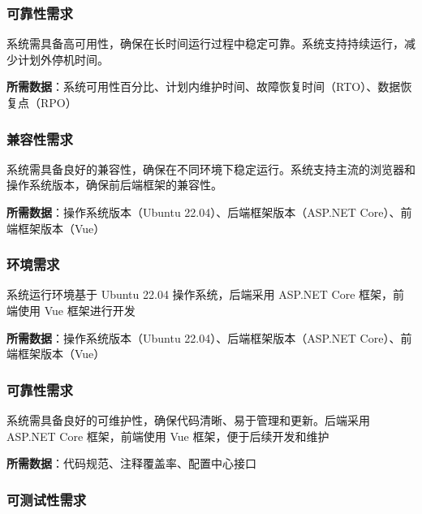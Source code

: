 \documentclass[]{article}
\begin{document}
\hypertarget{ux53efux9760ux6027ux9700ux6c42}{%
  \subsubsection{可靠性需求}\label{ux53efux9760ux6027ux9700ux6c42}}

系统需具备高可用性，确保在长时间运行过程中稳定可靠。系统支持持续运行，减少计划外停机时间。

\textbf{所需数据}：系统可用性百分比、计划内维护时间、故障恢复时间（RTO）、数据恢复点（RPO）

\hypertarget{ux517cux5bb9ux6027ux9700ux6c42}{%
  \subsubsection{兼容性需求}\label{ux517cux5bb9ux6027ux9700ux6c42}}

系统需具备良好的兼容性，确保在不同环境下稳定运行。系统支持主流的浏览器和操作系统版本，确保前后端框架的兼容性。

\textbf{所需数据}：操作系统版本（Ubuntu 22.04）、后端框架版本（ASP.NET
Core）、前端框架版本（Vue）

\hypertarget{ux73afux5883ux9700ux6c42}{%
  \subsubsection{环境需求}\label{ux73afux5883ux9700ux6c42}}

系统运行环境基于 Ubuntu 22.04 操作系统，后端采用 ASP.NET Core
框架，前端使用 Vue 框架进行开发

\textbf{所需数据}：操作系统版本（Ubuntu 22.04）、后端框架版本（ASP.NET
Core）、前端框架版本（Vue）

\hypertarget{ux53efux9760ux6027ux9700ux6c42-1}{%
  \subsubsection{可靠性需求}\label{ux53efux9760ux6027ux9700ux6c42-1}}

系统需具备良好的可维护性，确保代码清晰、易于管理和更新。后端采用 ASP.NET
Core 框架，前端使用 Vue 框架，便于后续开发和维护

\textbf{所需数据}：代码规范、注释覆盖率、配置中心接口

\hypertarget{ux53efux6d4bux8bd5ux6027ux9700ux6c42}{%
  \subsubsection{可测试性需求}\label{ux53efux6d4bux8bd5ux6027ux9700ux6c42}}
\end{document}
